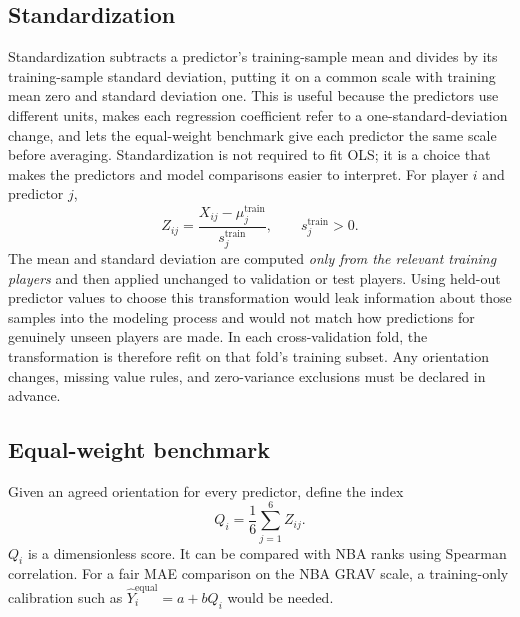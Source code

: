 \documentclass[11pt]{article}
\begin{document}
\subsection{Standardization}
Standardization subtracts a predictor's training-sample mean and divides by
its training-sample standard deviation, putting it on a common scale with
training mean zero and standard deviation one. This is useful because the
predictors use different units, makes each regression coefficient refer to
a one-standard-deviation change, and lets the equal-weight benchmark give
each predictor the same scale before averaging. Standardization is not
required to fit OLS; it is a choice that makes the predictors and model
comparisons easier to interpret.
For player $i$ and predictor $j$,
\begin{equation}
Z_{ij}=\frac{X_{ij}-\mu_j^{\mathrm{train}}}{s_j^{\mathrm{train}}},
\qquad s_j^{\mathrm{train}}>0.
\label{eq:zscore}
\end{equation}
The mean and standard deviation are computed \emph{only from the relevant
training players} and then applied unchanged to validation or test players.
Using held-out predictor values to choose this transformation would leak
information about those samples into the modeling process and would not
match how predictions for genuinely unseen players are made. In each
cross-validation fold, the transformation is therefore refit on that
fold's training subset. Any orientation changes, missing value rules, and
zero-variance exclusions must be declared in advance.

\subsection{Equal-weight benchmark}
Given an agreed orientation for every predictor, define the index
\begin{equation}
Q_i=\frac{1}{6}\sum_{j=1}^{6}Z_{ij}.
\label{eq:equal}
\end{equation}
$Q_i$ is a dimensionless score. It can be compared with NBA ranks using Spearman
correlation. For a fair MAE comparison on the NBA GRAV scale, a training-only
calibration such as $\widehat Y_i^{\mathrm{equal}}=a+bQ_i$ would be needed.
\end{document}
